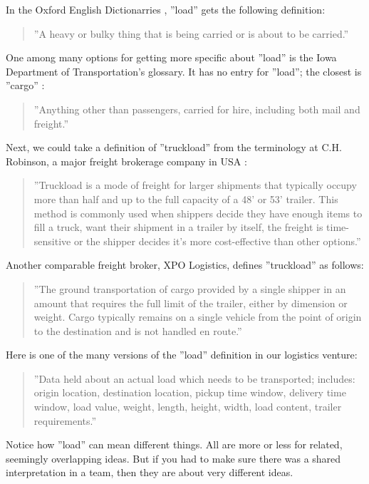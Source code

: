 \documentclass[graybox,envcountchap,sectrefs]{svmono}
\begin{document}
In the Oxford English Dictionarries \cite{oed-load}, ''load'' gets the following definition:

\begin{quote}
    ''A heavy or bulky thing that is being carried or is about to be carried.''
\end{quote}

One among many options for getting more specific about ''load'' is the Iowa Department of Transportation's glossary. It has no entry for ''load''; the closest is ''cargo'' \cite{iowa-dot-cargo}:

\begin{quote}
    ''Anything other than passengers, carried for hire, including both mail and freight.''
\end{quote}

Next, we could take a definition of ''truckload'' from the terminology at C.H. Robinson, a major freight brokerage company in USA \cite{chrobinson-truckload}:

\begin{quote}
    ''Truckload is a mode of freight for larger shipments that typically occupy more than half and up to the full capacity of a 48’ or 53’ trailer. This method is commonly used when shippers decide they have enough items to fill a truck, want their shipment in a trailer by itself, the freight is time-sensitive or the shipper decides it’s more cost-effective than other options.''
\end{quote}
Another comparable freight broker, XPO Logistics, defines ''truckload'' as follows:
\begin{quote}
    ''The ground transportation of cargo provided by a single shipper in an amount that requires the full limit of the trailer, either by dimension or weight. Cargo typically remains on a single vehicle from the point of origin to the destination and is not handled en route.''
\end{quote}
Here is one of the many versions of the ''load'' definition in our logistics venture:
\begin{quote}
    ''Data held about an actual load which needs to be transported; includes: origin location, destination location, pickup time window, delivery time window, load value, weight, length, height, width, load content, trailer requirements.''
\end{quote}
Notice how ''load'' can mean different things. All are more or less for related, seemingly overlapping ideas. But if you had to make sure there was a shared interpretation in a team, then they are about very different ideas.
\end{document}
